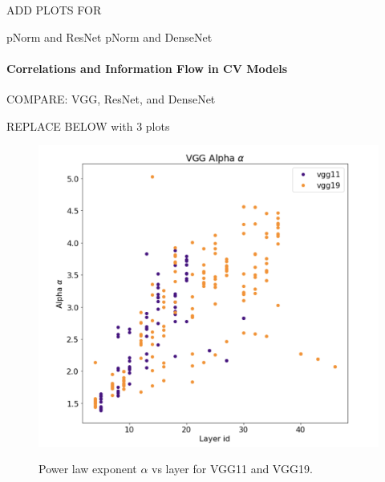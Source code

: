 ADD PLOTS FOR

pNorm and ResNet
pNorm and DenseNet


\paragraph{Correlations and Information Flow in CV Models}

COMPARE:  VGG, ResNet, and DenseNet

REPLACE BELOW with 3 plots

\begin{figure}
  \centering
  \includegraphics[scale=0.30]{img/vgg-alpha-layers.png}
  \label{fig:vgg-alpha-layers}
    \caption{Power law exponent $\alpha$ vs layer for VGG11 and VGG19. }
\end{figure}

